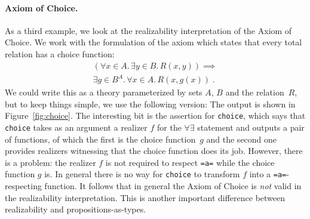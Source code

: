 \begin{figure*}
  \centering
  {\small{}}
  \caption{Output for theories \texttt{Iteration} and \texttt{Nat}}
  \label{fig:nat}
\end{figure*}


\paragraph{Axiom of Choice.}
\label{sec:axiom-choice}

As a third example, we look at the realizability interpretation of the
Axiom of Choice. We work with the formulation of the axiom which
states that every total relation has a choice function:
%
\begin{multline*}
  (\forall x \in A .\,
   \exists y \in B .\, R(x, y)) \implies \\
  \exists g \in B^A .\,
  \forall x \in A .\, R(x, g(x)) \;.
\end{multline*}
%
We could write this as a theory parameterized by sets $A$, $B$ and the
relation~$R$, but to keep things simple, we use the following version:
%
{\small{}}%
%
The output is shown in Figure~\ref{fig:choice}. The interesting bit is
the assertion for \Verb|choice|, which says that \Verb|choice| takes
as an argument a realizer $f$ for the $\forall\exists$ statement and
outputs a pair of functions, of which the first is the choice
function~$g$ and the second one provides realizers witnessing that the
choice function does its job. However, there is a problem: the
realizer $f$ is not required to respect \Verb|=a=| while the choice
function $g$ is. In general there is no way for \Verb|choice| to
transform $f$ into a \Verb|=a=|-respecting function. It follows that
in general the Axiom of Choice is \emph{not} valid in the
realizability interpretation. This is another important difference
between realizability and propositions-as-types.

\begin{figure*}
  \centering
  {\small {}}
  \caption{Output for theory \texttt{Choice}}
  \label{fig:choice}
\end{figure*}


